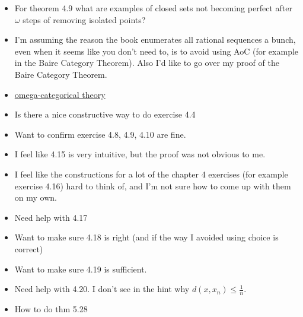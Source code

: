 \documentclass{article}
\theoremstyle{definition}
\begin{document}
\begin{itemize}
    \item For theorem 4.9 what are examples of closed sets not becoming perfect after $\omega$ steps of removing isolated points?
    \item I'm assuming the reason the book enumerates all rational sequences a bunch, even when it seems like you don't need to, is to avoid using AoC (for example in the Baire Category Theorem). Also I'd like to go over my proof of the Baire Category Theorem.
    \item \href{https://en.wikipedia.org/wiki/Omega-categorical_theory#Examples}{omega-categorical theory}
    \item Is there a nice constructive way to do exercise 4.4
    \item Want to confirm exercise 4.8, 4.9, 4.10 are fine.
    \item I feel like 4.15 is very intuitive, but the proof was not obvious to me.
    \item I feel like the constructions for a lot of the chapter 4 exercises (for example exercise 4.16) hard to think of, and I'm not sure how to come up with them on my own.
    \item Need help with 4.17
    \item Want to make sure 4.18 is right (and if the way I avoided using choice is correct)
    \item Want to make sure 4.19 is sufficient.
    \item Need help with 4.20. I don't see in the hint why $d(x, x_n) \le \frac{1}{n}$.
    \item How to do thm 5.28
\end{itemize}
\end{document}
